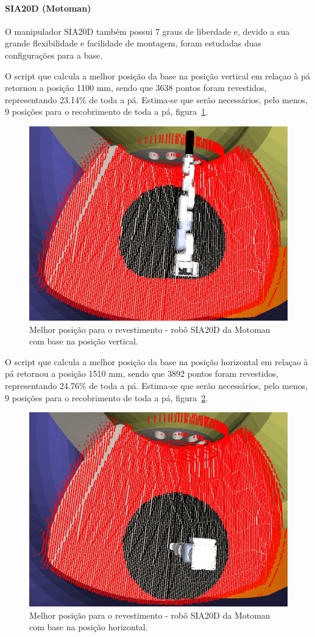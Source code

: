 \paragraph{SIA20D (Motoman)}
O manipulador SIA20D também possui 7 graus de liberdade e, devido a sua
grande flexibilidade e facilidade de montagem, foram estudadas duas
configurações para a base.

O script que calcula a melhor posição da base na posição vertical em relaçao à
pá retornou a posição 1100 mm, sendo que 3638 pontos foram revestidos,
representando 23.14\% de toda a pá. Estima-se que serão necessários, pelo menos,
9 posições para o recobrimento de toda a pá, figura~\ref{fig::sia20dbestposv}.

\begin{figure}[h!]	
	\centering
	\includegraphics[width=0.7\columnwidth]{detail/figs/bighatch/sia20d_bestposv.png}
	\caption{Melhor posição para o revestimento - robô SIA20D da Motoman com base
	na posição vertical.}
	\label{fig::sia20dbestposv}
\end{figure}

O script que calcula a melhor posição da base na posição horizontal em relaçao à
pá retornou a posição 1510 mm, sendo que 3892 pontos foram revestidos,
representando 24.76\% de toda a pá. Estima-se que serão necessários, pelo menos,
9 posições para o recobrimento de toda a pá, figura~\ref{fig::sia20dbestposh}.

\begin{figure}[h!]	
	\centering
	\includegraphics[width=0.7\columnwidth]{detail/figs/bighatch/sia20d_bestposh.png}
	\caption{Melhor posição para o revestimento - robô SIA20D da Motoman com base
	na posição horizontal.}
	\label{fig::sia20dbestposh}
\end{figure}

